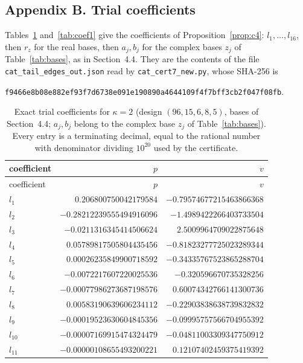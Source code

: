 \documentclass[11pt]{article}
\theoremstyle{definition}
\begin{document}
\clearpage
\subsection*{Appendix B. Trial coefficients}

Tables~\ref{tab:coef2} and~\ref{tab:coef1} give the coefficients of Proposition~\ref{prop:c4}: $l_1,\dots,l_{16}$, then $r_z$ for the real bases, then $a_j,b_j$ for the complex bases $z_j$ of Table~\ref{tab:bases}, as in Section~4.4. They are the contents of the file \texttt{cat\_tail\_edges\_out.json} read by \texttt{cat\_cert7\_new.py}, whose SHA-256 is
\begin{center}\texttt{f9466e8b08e882ef93f7d6738e091e190890a4644109f4f7bff3cb2f047f08fb}.\end{center}

{\small
\begin{longtable}{lrr}
\caption{Exact trial coefficients for $\kappa=2$ (design $(96,15,6,8,5)$, bases of Section~4.4; $a_j,b_j$ belong to the complex base $z_j$ of Table~\ref{tab:bases}). Every entry is a terminating decimal, equal to the rational number with denominator dividing $10^{20}$ used by the certificate.}\label{tab:coef2}\\
\toprule coefficient & $p$ & $v$\\\midrule\endfirsthead
\toprule coefficient & $p$ & $v$\\\midrule\endhead
$l_{1}$ & $0.206800750042179584$ & $-0.79574677215463866368$\\
$l_{2}$ & $-0.28212239555494916096$ & $-1.4989422266403733504$\\
$l_{3}$ & $-0.0211316345414506624$ & $2.5009964709022875648$\\
$l_{4}$ & $0.05789817505804435456$ & $-0.81823277725023289344$\\
$l_{5}$ & $0.00026235849900718592$ & $-0.34335767523865288704$\\
$l_{6}$ & $-0.0072217607220025536$ & $-0.320596670735328256$\\
$l_{7}$ & $-0.00077986273687198576$ & $0.60074342766141300736$\\
$l_{8}$ & $0.00583190639606234112$ & $-0.22903838638739832832$\\
$l_{9}$ & $-0.00019523630604845356$ & $-0.09995757566704955392$\\
$l_{10}$ & $-0.00007169915474324479$ & $-0.04811003309347750912$\\
$l_{11}$ & $-0.00000108655493200221$ & $0.12107402459375419392$\\

\end{longtable}}
\end{document}
